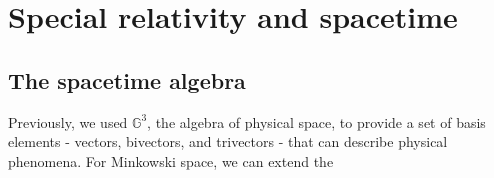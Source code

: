 \chapter{Special relativity and spacetime}

\section{The spacetime algebra}

Previously, we used $\mathbb{G}^3$, the algebra of physical space, to provide a set of basis 
elements - vectors, bivectors, and trivectors - that can describe physical phenomena. For Minkowski
space, we can extend the 
